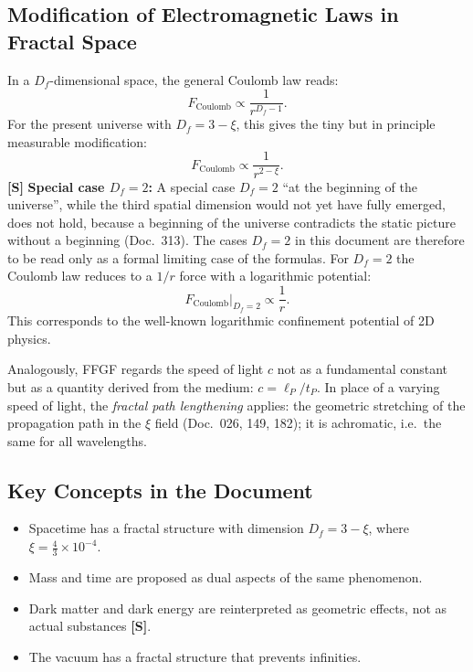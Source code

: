 	\subsection{Modification of Electromagnetic Laws in Fractal Space}
	In a \(D_f\)-dimensional space, the general Coulomb law reads:
	\begin{equation}
		F_{\text{Coulomb}} \propto \frac{1}{r^{D_f - 1}}.
		\label{eq:fractal_coulomb_general}
	\end{equation}
	For the present universe with \(D_f = 3-\xi\), this gives the tiny but in principle measurable modification:
	\begin{equation}
		F_{\text{Coulomb}} \propto \frac{1}{r^{2 - \xi}}.
		\label{eq:fractal_coulomb}
	\end{equation}
	\textbf{[S]} \textbf{Special case \(D_f = 2\):}
	A special case \(D_f = 2\) ``at the beginning of the universe'', while the third spatial dimension would not yet have fully emerged, does not hold, because a beginning of the universe contradicts the static picture without a beginning (Doc.~313). The cases \(D_f = 2\) in this document are therefore to be read only as a formal limiting case of the formulas. For \(D_f = 2\) the Coulomb law reduces to a $1/r$ force with a logarithmic potential:
	\begin{equation}
		F_{\text{Coulomb}}\big|_{D_f=2} \propto \frac{1}{r}.
		\label{eq:coulomb_df2}
	\end{equation}
	This corresponds to the well-known logarithmic confinement potential of 2D physics.

	Analogously, FFGF regards the speed of light \(c\) not as a fundamental constant but as a quantity derived from the medium: \(c = \ell_P / t_P\). In place of a varying speed of light, the \emph{fractal path lengthening} applies: the geometric stretching of the propagation path in the $\xi$ field (Doc.~026, 149, 182); it is achromatic, i.e.\ the same for all wavelengths.
	
	\subsection{Key Concepts in the Document}
	\begin{itemize}
		\item Spacetime has a fractal structure with dimension \( D_f = 3 - \xi \), where \( \xi = \frac{4}{3} \times 10^{-4} \).
		\item Mass and time are proposed as dual aspects of the same phenomenon.
		\item Dark matter and dark energy are reinterpreted as geometric effects, not as actual substances \textbf{[S]}.
		\item The vacuum has a fractal structure that prevents infinities.
	\end{itemize}
	
